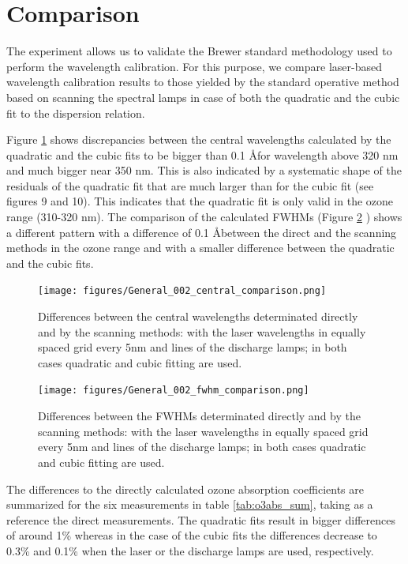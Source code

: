 \documentclass[acp, manuscript]{copernicus}
\begin{document}
\section{Comparison }

The experiment allows us to validate the Brewer standard methodology used to perform the wavelength calibration. For this purpose, we compare laser-based wavelength calibration results to those yielded by the standard operative method based on scanning the spectral lamps in case of both the quadratic and the cubic fit to the dispersion relation.

Figure \ref{fig:cw_comp} shows discrepancies between the central wavelengths calculated by the quadratic and the cubic fits to be bigger than 0.1 \AA for wavelength above 320 \unit{nm} and much bigger near 350 nm. This is  also indicated by a systematic shape of the residuals of the quadratic fit that are much larger than for the cubic fit (see figures 9 and 10). This indicates that the quadratic fit is only valid in the ozone range (310-320 nm). The comparison of the calculated FWHMs (Figure \ref{fig:fwhm_comp} ) shows a different pattern with a difference of 0.1 \AA between the direct and the scanning methods in the ozone range and with a smaller difference between the quadratic and the cubic fits.

\begin{figure}[t]
\texttt{[image: figures/General\_002\_central\_comparison.png]}
\caption{Differences between the central wavelengths determinated directly and by the scanning methods: with the laser wavelengths in equally spaced grid every 5\unit{nm} and lines of the discharge lamps; in both cases quadratic and cubic fitting are used.}
\label{fig:cw_comp}
\end{figure}



\begin{figure}[t]
\texttt{[image: figures/General\_002\_fwhm\_comparison.png]}
\caption{Differences between the FWHMs determinated directly and by the scanning methods: with the laser wavelengths in equally spaced grid every 5nm and lines of the discharge lamps; in both cases quadratic and cubic fitting are used.}
\label{fig:fwhm_comp}
\end{figure}


The differences to the directly calculated ozone absorption coefficients are summarized for the six measurements in table \ref{tab:o3abs_sum}, taking as a reference the direct measurements. The quadratic fits result in bigger differences of around 1\% whereas in the case of the cubic fits the differences decrease to 0.3\% and  0.1\%  when the laser or the discharge lamps are used, respectively.   
\end{document}
